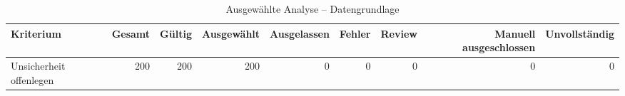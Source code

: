 \begin{table}[htbp]
\centering
\caption{Ausgewählte Analyse -- Datengrundlage}
\begin{tabular}{lrrrrrrrr}
\toprule
Kriterium & Gesamt & Gültig & Ausgewählt & Ausgelassen & Fehler & Review & Manuell ausgeschlossen & Unvollständig \\
\midrule
Unsicherheit offenlegen & 200 & 200 & 200 & 0 & 0 & 0 & 0 & 0 \\
\bottomrule
\end{tabular}
\end{table}
